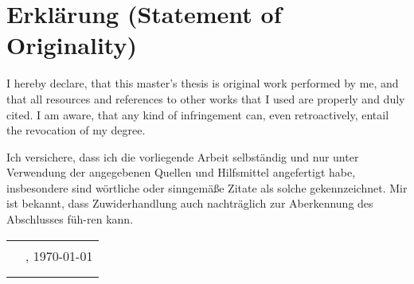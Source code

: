 \section*{Erklärung (Statement of Originality)}\label{erklaerung}

I hereby declare, that this master's thesis is original work performed by me, and that all resources and references to other works that I used are properly and duly cited. I am aware, that any kind of infringement can, even retroactively, entail the revocation of my degree.
\medskip

Ich versichere, dass ich die vorliegende Arbeit selbständig und nur
unter Verwendung der angegebenen Quellen und Hilfsmittel angefertigt
habe, insbesondere sind wörtliche oder sinngemäße Zitate als solche
gekennzeichnet. Mir ist bekannt, dass Zuwiderhandlung auch nachträglich
zur Aberkennung des Abschlusses füh-ren kann.\vspace{3em}

\begin{tabular}{c l}
    \rule{.4\textwidth}{.4pt}               & \documentPlace{}, \germanDate{}\today{} \\
    {\footnotesize\documentAuthor{}}        &
\end{tabular}